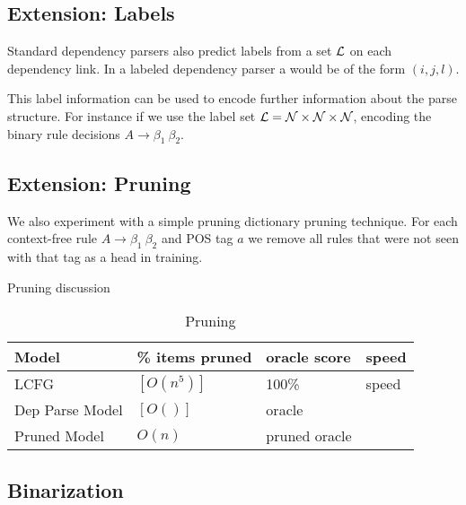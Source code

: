 \documentclass[11pt,letterpaper]{article}
\newcommand{\nonterms}{\mathcal{N}}
\newcommand{\Rule}[3]{#1 \rightarrow #2\ #3}
\begin{document}




\subsection{Extension: Labels}


Standard dependency parsers also predict labels from a set ${\cal L}$ on each dependency link.
In a labeled dependency parser a would be of the form $(i, j, l)$.

This label information can be used to encode further information about the parse structure. For instance
if we use the label set ${\cal L} = \nonterms \times \nonterms \times \nonterms$, encoding the binary rule decisions $\Rule{A}{\beta_1}{\beta_2}$.



\subsection{Extension: Pruning}
\label{sec:prune}

We also experiment with a simple pruning dictionary pruning technique.
For each context-free rule $A \rightarrow \beta_1\ \beta_2$ and POS tag $a$ we
remove all rules that were not seen with that tag as a head in training.


Pruning discussion


\begin{table}
  \centering
  \begin{tabular}{|l|lll|}
    \hline
    Model & \% items pruned & oracle score & speed \\
    \hline

    \hline
    LCFG &   $[O(n^5)]$ &  100\% & speed  \\
    Dep Parse Model  & $[O()]$ & oracle  &  \\
    Pruned Model & $O(n)$ &  pruned oracle & \\
    \hline
  \end{tabular}
  \caption{Pruning }
\end{table}


\subsection{Binarization}
\end{document}
